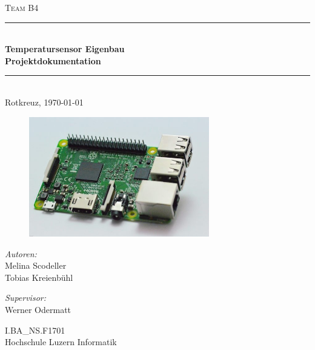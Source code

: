\begin{titlepage}   

\begin{center}
\textsc{\Large Team B4}\\[0.5cm]

\newcommand{\HRule}{\rule{\linewidth}{0.5mm}}
\HRule \\[0.4cm]
{ \huge \bfseries Temperatursensor Eigenbau}\\[0.4cm]
{ \LARGE \bfseries Projektdokumentation}\\[0.4cm]
\HRule \\[1.5cm]

{\large Rotkreuz, \today}

\begin{figure}[H]%
\centering
\includegraphics[width=0.7\textwidth]{Images/Titelbild.jpg}
\label{fig:title}
\end{figure}
\begin{minipage}{0.4\textwidth}
\begin{flushleft} \large
\emph{Autoren:}\\
Melina Scodeller\\
Tobias Kreienbühl\\
\end{flushleft}
\end{minipage}
\hfill
\begin{minipage}{0.4\textwidth}
\begin{flushright} \large
\emph{Supervisor:} \\
Werner Odermatt
\end{flushright}
\end{minipage}
\large
\vfill
I.BA\_NS.F1701 \\
Hochschule Luzern Informatik

\end{center}

\end{titlepage}